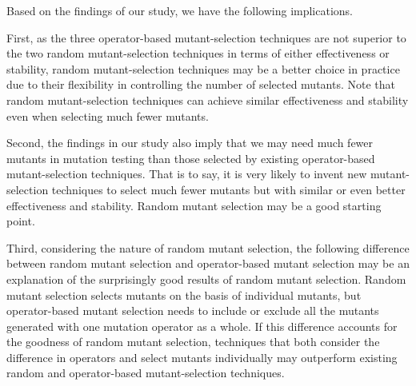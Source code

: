 Based on the findings of our study, we have the following
implications.

First, as the three operator-based mutant-selection techniques are
not superior to the two random mutant-selection techniques in
terms of either effectiveness or stability, random
mutant-selection techniques may be a better choice in practice due
to their flexibility in controlling the number of selected
mutants. Note that random mutant-selection techniques can achieve
similar effectiveness and stability even when selecting much fewer
mutants.

Second, the findings in our study also imply that we may need much
fewer mutants in mutation testing than those selected by existing
operator-based mutant-selection techniques. That is to say, it is
very likely to invent new mutant-selection techniques to select
much fewer mutants but with similar or even better effectiveness
and stability. Random mutant selection may be a good starting
point.

Third, considering the nature of random mutant selection, the
following difference between random mutant selection and
operator-based mutant selection may be an explanation of the
surprisingly good results of random mutant selection. Random
mutant selection selects mutants on the basis of individual
mutants, but operator-based mutant selection needs to include or
exclude all the mutants generated with one mutation operator as a
whole. If this difference accounts for the goodness of random
mutant selection, techniques that both consider the difference in
operators and select mutants individually may outperform existing
random and operator-based mutant-selection techniques.
